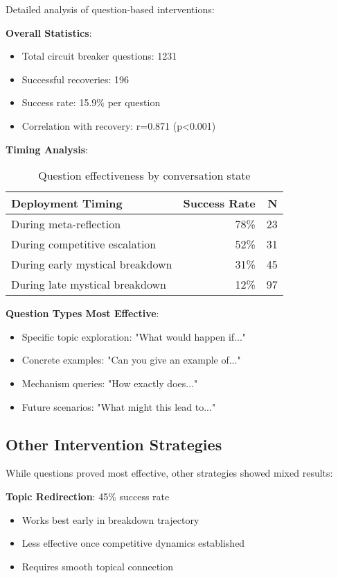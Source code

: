 \documentclass[11pt,letterpaper]{article}
\newcommand{\exponedataQuestionCorrelation}{0.871}
\newcommand{\exponedataQuestionPValue}{p<0.001}
\newcommand{\exponedataTotalQuestions}{1231}
\newcommand{\exponedataTotalRecoveries}{196}
\newcommand{\exponedataQuestionSuccessRate}{15.9\%}
\begin{document}
Detailed analysis of question-based interventions:

\textbf{Overall Statistics}:
\begin{itemize}
    \item Total circuit breaker questions: \exponedataTotalQuestions{}
    \item Successful recoveries: \exponedataTotalRecoveries{}
    \item Success rate: \exponedataQuestionSuccessRate{} per question
    \item Correlation with recovery: r=\exponedataQuestionCorrelation{} (\exponedataQuestionPValue{})
\end{itemize}

\textbf{Timing Analysis}:
\begin{table}[h]
\centering
\begin{tabular}{lrr}
\toprule
\textbf{Deployment Timing} & \textbf{Success Rate} & \textbf{N} \\
\midrule
During meta-reflection & 78\% & 23 \\
During competitive escalation & 52\% & 31 \\
During early mystical breakdown & 31\% & 45 \\
During late mystical breakdown & 12\% & 97 \\
\bottomrule
\end{tabular}
\caption{Question effectiveness by conversation state}
\label{tab:question_timing}
\end{table}

\textbf{Question Types Most Effective}:
\begin{itemize}
    \item Specific topic exploration: "What would happen if..."
    \item Concrete examples: "Can you give an example of..."
    \item Mechanism queries: "How exactly does..."
    \item Future scenarios: "What might this lead to..."
\end{itemize}

\subsection{Other Intervention Strategies}

While questions proved most effective, other strategies showed mixed results:

\textbf{Topic Redirection}: 45\% success rate
\begin{itemize}
    \item Works best early in breakdown trajectory
    \item Less effective once competitive dynamics established
    \item Requires smooth topical connection
\end{itemize}
\end{document}
